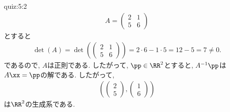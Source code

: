 \begin{answerof}{quiz:5:2}
  \begin{align*}
    A=
    \begin{pmatrix}
      2&1\\5&6
    \end{pmatrix}
  \end{align*}
  とすると
  \begin{align*}
    \det(A)=
    \det(\begin{pmatrix}
      2&1\\5&6
    \end{pmatrix})=2\cdot 6 -1\cdot 5=12-5=7\neq 0.
 \end{align*}
  であるので, $A$は正則である.
  したがって, $\pp\in\RR^2$とすると,
  $A^{-1}\pp$は$A\xx=\pp$の解である.
  したがって,
  \begin{align*}
   (\begin{pmatrix}2\\5\end{pmatrix},\begin{pmatrix}1\\6\end{pmatrix})
  \end{align*}
  は$\RR^2$の生成系である.



\end{answerof}
